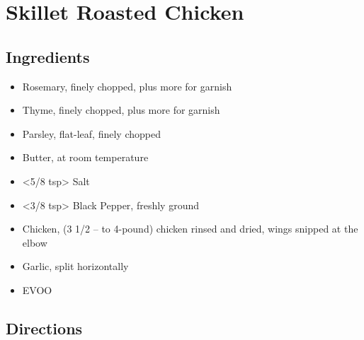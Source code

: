 \section{Skillet Roasted Chicken}

\subsection{ Ingredients }

\begin{itemize}
  \item <3 sprigs> Rosemary, finely chopped, plus more for garnish
  \item <6 sprigs> Thyme, finely chopped, plus more for garnish
  \item <8 sprigs> Parsley, flat-leaf, finely chopped
  \item <4 tbs> Butter, at room temperature
  \item <5/8 tsp> Salt
  \item <3/8 tsp> Black Pepper, freshly ground
  \item <2 lbs> Chicken, (3 1/2 – to 4-pound) chicken rinsed and dried, wings snipped at the elbow
  \item <3 head of garlic> Garlic, split horizontally
  \item <3 tbs> EVOO
\end{itemize}

\subsection{ Directions }

